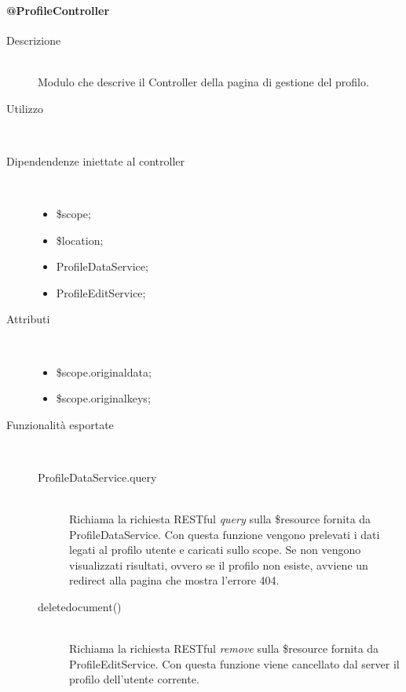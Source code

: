 \paragraph{@ProfileController}
\begin{description}
 \item[Descrizione] \hfill \\
 Modulo che descrive il Controller della pagina di gestione del profilo.
 
 \item[Utilizzo] \hfill \\
 
 \item[Dipendendenze iniettate al controller] \hfill \\
 \begin{itemize}
  \item \$scope;
  \item \$location;
  \item ProfileDataService;
  \item ProfileEditService;
  
 \end{itemize}
 
 \item[Attributi] \hfill \\
 \begin{itemize}
 \item \$scope.original\textunderscore data;
 \item \$scope.original\textunderscore keys;

 \end{itemize}
 
 \item[Funzionalità esportate] \hfill \\
 \begin{description}
  \item[ProfileDataService.query] \hfill \\
  Richiama la richiesta RESTful \textit{query} sulla \$resource fornita da ProfileDataService.
  Con questa funzione vengono prelevati i dati legati al profilo utente e caricati sullo scope.
	Se non vengono visualizzati risultati, ovvero se il profilo non esiste, avviene un redirect alla pagina
  che mostra l'errore 404. 
  	\item[delete\textunderscore document()] \hfill \\
  Richiama la richiesta RESTful \textit{remove} sulla \$resource fornita da ProfileEditService.
  Con questa funzione viene cancellato dal server il profilo dell'utente corrente.
 \end{description}
\end{description}

